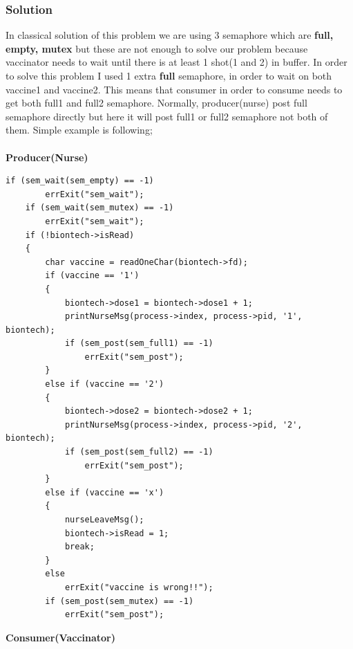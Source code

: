 \documentclass{article}
\begin{document}
\subsubsection{Solution}
In classical solution of this problem we are using 3 semaphore which are \textbf{full, empty, mutex} but these are not enough to solve
our problem because vaccinator needs to wait until there is at least 1 shot(1 and 2) in buffer.
In order to solve this problem I used 1 extra \textbf{full} semaphore, in order to wait on both vaccine1 and vaccine2.
This means that consumer in order to consume needs to get both full1 and full2 semaphore. Normally, producer(nurse) post
full semaphore directly but here it will post full1 or full2 semaphore not both of them. Simple example is following; \\ \\
\textbf{Producer(Nurse)}
\begin{lstlisting}[style=CStyle]
    if (sem_wait(sem_empty) == -1)
        errExit("sem_wait");
    if (sem_wait(sem_mutex) == -1)
        errExit("sem_wait");
    if (!biontech->isRead)
    {
        char vaccine = readOneChar(biontech->fd);
        if (vaccine == '1')
        {
            biontech->dose1 = biontech->dose1 + 1;
            printNurseMsg(process->index, process->pid, '1', biontech);
            if (sem_post(sem_full1) == -1)
                errExit("sem_post");
        }
        else if (vaccine == '2')
        {
            biontech->dose2 = biontech->dose2 + 1;
            printNurseMsg(process->index, process->pid, '2', biontech);
            if (sem_post(sem_full2) == -1)
                errExit("sem_post");
        }
        else if (vaccine == 'x')
        {
            nurseLeaveMsg();
            biontech->isRead = 1;
            break;
        }
        else
            errExit("vaccine is wrong!!");
        if (sem_post(sem_mutex) == -1)
            errExit("sem_post");
\end{lstlisting}
\textbf{Consumer(Vaccinator)}
\end{document}
